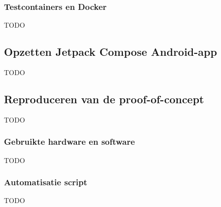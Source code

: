 \subsubsection{Testcontainers en Docker}
TODO

\subsection{Opzetten Jetpack Compose Android-app}
\label{subsec:opzetten-jetpack-compose-android-app}
TODO %

\subsection{Reproduceren van de proof-of-concept}
\label{subsec:reproduceren-van-de-proof-of-concept}
TODO

\subsubsection{Gebruikte hardware en software}
TODO %

\subsubsection{Automatisatie script}
TODO
